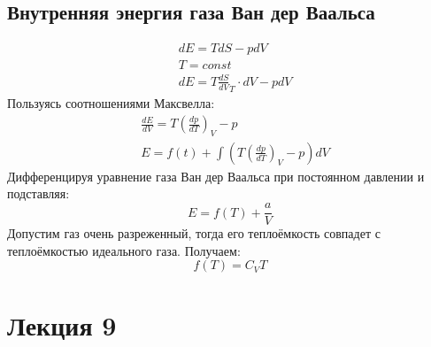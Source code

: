 \documentclass[a4paper, 12pt]{article}
\begin{document}
	\subsection{Внутренняя энергия газа Ван дер Ваальса}
	\begin{equation*}
		\begin{aligned}
			& dE = TdS - pdV                          \\
			& T = const                               \\
			& dE = T \frac{dS}{dV}_{T} \cdot dV - pdV 
		\end{aligned}
	\end{equation*}
	Пользуясь соотношениями Максвелла:
	\begin{equation*}
		\begin{aligned}
			& \frac{dE}{dV} = T(\frac{dp}{dT})_{V} - p      \\
			& E = f(t) + \int (T(\frac{dp}{dT})_{V} - p) dV 
		\end{aligned}
	\end{equation*}
	Дифференцируя уравнение газа Ван дер Ваальса при постоянном давлении и подставляя:
	\begin{equation*}
		E = f(T) + \frac{a}{V}
	\end{equation*}
	Допустим газ очень разреженный, тогда его теплоёмкость совпадет с теплоёмкостью идеального газа. Получаем:
	\begin{equation*}
		f(T) = C_{V} T
	\end{equation*}
	\section{Лекция 9}
\end{document}
